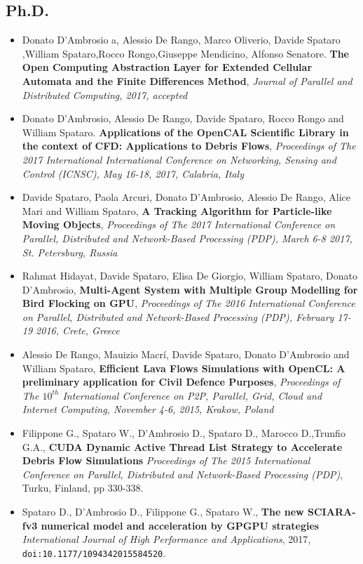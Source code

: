 \documentclass[a4paper,10pt]{article}
\begin{document}
\subsection{Ph.D.}


\begin{itemize}

\item Donato D’Ambrosio a, Alessio De Rango, Marco Oliverio, Davide Spataro ,William Spataro,Rocco Rongo,Giuseppe Mendicino, Alfonso Senatore. \textbf{The Open Computing Abstraction Layer for Extended Cellular Automata and the Finite Differences Method}, \emph{Journal of Parallel and Distributed Computing, 2017, accepted} 

\item Donato D'Ambrosio, Alessio De Rango, Davide Spataro, Rocco Rongo and William Spataro. \textbf{Applications of the OpenCAL Scientific Library in the context of CFD: Applications to Debris Flows}, \emph{Proceedings of The 2017 International
  International Conference on Networking, Sensing and Control (ICNSC),
  May 16-18, 2017, Calabria, Italy} 

  \item Davide Spataro, Paola Arcuri, Donato D'Ambrosio, Alessio De Rango, Alice Mari and William Spataro, \textbf{A Tracking Algorithm for Particle-like Moving Objects}, \emph{Proceedings of The 2017 International
  Conference on Parallel, Distributed and Network-Based Processing (PDP),
  March 6-8 2017, St. Petersburg, Russia
  }
  \item Rahmat Hidayat, Davide Spataro, Elisa De Giorgio, William Spataro,
  Donato D'Ambrosio, \textbf{Multi-Agent System with Multiple Group Modelling
  for Bird Flocking on GPU}, \emph{Proceedings of The 2016 International
  Conference on Parallel, Distributed and Network-Based Processing (PDP),
  February 17-19 2016, Crete, Greece}

\item Alessio De Rango, Mauizio Macr\'i, Davide Spataro, Donato D'Ambrosio and
  William Spataro, \textbf{Efficient Lava Flows Simulations with OpenCL: A
  preliminary application for Civil Defence Purposes}, \emph{Proceedings of
  The $10^{th}$ International Conference on P2P, Parallel, Grid, Cloud and
  Internet Computing, November 4-6, 2015, Krakow, Poland}
  
	\item Filippone G., Spataro W., D'Ambrosio D., Spataro D., 
	Marocco D.,Trunfio G.A., \textbf{CUDA Dynamic Active Thread List Strategy 
	to Accelerate Debris Flow Simulations} \emph{Proceedings of The 2015 International Conference on Parallel, 
	Distributed and Network-Based Processing (PDP)}, Turku, Finland, pp 330-338.

	\item Spataro D., D'Ambrosio D., Filippone G., Spataro W., \textbf{The new
	SCIARA-fv3 numerical model and acceleration by GPGPU strategies}
\emph{International Journal of High Performance and Applications}, 2017,
\texttt{doi:10.1177/1094342015584520}.


\end{itemize}
\end{document}
